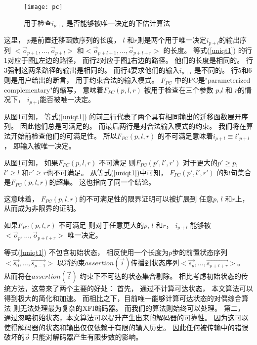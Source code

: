 \begin{figure}[b]
\begin{center}
\texttt{[image: pc]}
\end{center}
\caption{用于检查$i_{p+l}$ 是否能够被唯一决定的下估计算法}
  \label{fig_pc}
\end{figure}


这里，
$p$是前置迁移函数序列的长度，
$l$ 和$r$则是两个用于唯一决定$i_{p+l}$的输出序列
$<\vec{o}_{p+1},\dots,\vec{o}_{p+l}>$ 和$<\vec{o}_{p+l+1},\dots,\vec{o}_{p+l+r}>$
的长度。
等式(\ref{uniqt1}) 的行1对应于图\ref{fig_pc}左边的路径，
而行2对应于图\ref{fig_pc}右边的路径。
他们的长度是相同的。
行3强制这两条路径的输出是相同的。
而行4要求他们的输入$i_{p+l}$ 是不同的。
行5和6则是用户给出的断言，
用于约束合法的输入模式。
$F_{PC}$ 中的PC是"parameterized complementary"的缩写，
意味着$F_{PC}(p,l,r)$ 被用于检查在三个参数 $p$,$l$ 和 $r$的情况下，
$i_{p+l}$能否被唯一决定。


从图\ref{fig_pc}可知，
等式(\ref{uniqt1}) 的前三行代表了两个具有相同输出的迁移函数展开序列。
因此他们总是可满足的。
而最后两行是对合法输入模式的约束。
我们将在算法开始前检查他们的可满足性。
所以$F_{PC}(p,l,r)$ 的不可满足意味着$i_{p+l}\equiv i'_{p+l}$，
即输入被唯一决定。

从图\ref{fig_pc}可知，
如果$F_{PC}(p,l,r)$ 不可满足
则$F_{PC}(p',l',r')$ 对于更大的$p'\ge p$, $l'\ge l$ 和$r'\ge r$也不可满足。
从等式(\ref{uniqt1})中可知，
$F_{PC}(p',l',r')$ 的短句集合是$F_{PC}(p,l,r)$的超集。
这也指向了同一个结论。

这意味着，
$F_{PC}(p,l,r)$的不可满足性的限界证明可以被扩展到
任意$p$, $l$ 和$r$上，
从而成为非限界的证明。

\begin{proposition}\label{prop_pc1}
如果$F_{PC}(p,l,r)$ 不可满足
则对于任意更大的$p$, $l$ 和$r$，
$i_{p+l}$ 能够被$<\vec{o}_{p},\dots,\vec{o}_{p+l+r}>$ 唯一决定。
\end{proposition}

等式(\ref{uniqt1}) 不包含初始状态，
相反使用一个长度为$p$步的前置状态序列$<\vec{s_0},\dots,\vec{s_{p-1}}>$
以将约束$assertion(\vec{i})$传播到状态序列$<\vec{s_p},\dots,\vec{s_{p+l+r}}>$。
从而将在$assertion(\vec{i})$ 约束下不可达的状态集合剔除。
相比考虑初始状态的传统方法，这带来了两个主要的好处：
首先，
通过不计算可达状态，
本文算法可以得到极大的简化和加速。
而相比之下，目前唯一能够计算可达状态的对偶综合算法
则无法处理最为复杂的XFI编码器。
而我们的算法则始终可以处理。
第二，
通过忽略初始状态，本文算法可以提升产生出来的解码器的可靠性。
因为这可以使得解码器的状态和输出仅仅依赖于有限的输入历史。
因此任何被传输中的错误破坏的$\vec{o}$ 只能对解码器产生有限步数的影响。

